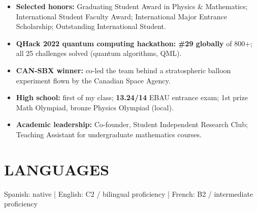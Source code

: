 \documentclass[10pt,a4paper]{article}
\begin{document}
\begin{itemize}

  \item
  \textbf{Selected honors:}
  Graduating Student Award in Physics \& Mathematics;
  International Student Faculty Award;
  International Major Entrance Scholarship;
  Outstanding International Student.

  \item
  \textbf{QHack 2022 quantum computing hackathon:} \textbf{\#29 globally} of 800+; all 25 challenges solved (quantum algorithms, QML).

  \item
  \textbf{CAN-SBX winner:}
  co-led the team behind a stratospheric balloon experiment flown by the Canadian Space Agency.

  \item
  \textbf{High school:}
  first of my class; \textbf{13.24/14} EBAU entrance exam; 1st prize Math Olympiad, bronze Physics Olympiad (local).

  \item
  \textbf{Academic leadership:}
  Co-founder, Student Independent Research Club;
  Teaching Assistant for undergraduate mathematics courses.

\end{itemize}


\section{LANGUAGES}

\small

Spanish: native
\;|\;
English: C2 / bilingual proficiency
\;|\;
French: B2 / intermediate proficiency
\end{document}
